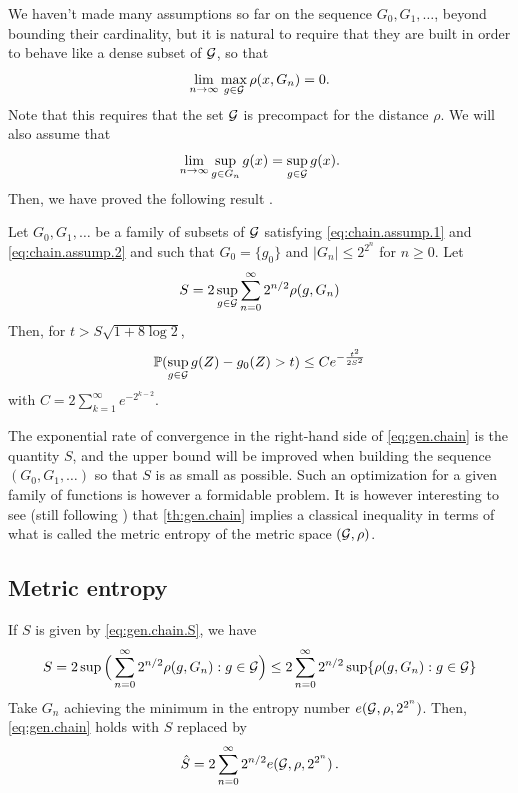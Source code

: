 We haven't made many assumptions so far on the sequence $G_0, G_1, \ldots$, beyond bounding their cardinality, but it is natural to require that they are built in order to behave like a dense subset of ${\mathcal G}$, so that 
\begin{equation}
\label{eq:chain.assump.1}
\lim_{n\to\infty} \max_{g\in {\mathcal G}} \rho(x, G_n) =0.
\end{equation}
Note that this requires that the set ${\mathcal G}$ is precompact for the distance $\rho$. We will also assume that 
\begin{equation}
\label{eq:chain.assump.2}
\lim_{n\to\infty} \sup_{g\in G_n} g(x) = \sup_{g\in {\mathcal G}} g(x).
\end{equation}
Then, we have proved the following result \citep{talagrand2006generic}.
\begin{theorem}
\label{th:gen.chain}
Let $G_0, G_1, \ldots$ be a family of subsets of ${\mathcal G}$ satisfying \cref{eq:chain.assump.1} and \cref{eq:chain.assump.2} and such that $G_0 = \{g_0\}$ and $|G_n| \leq 2^{2^n}$ for $n\geq 0$. Let 
\begin{equation}
\label{eq:gen.chain.S}
S = 2 \sup_{g\in {\mathcal G}} \sum_{n=0}^\infty 2^{n/2} \rho(g, G_n)
\end{equation}
Then, for $t>  S \sqrt{1 + 8\log 2}$, 
\begin{equation}
\label{eq:gen.chain}
\bm{\mathbb P}(\sup_{g\in {\mathcal G}} g(Z) - g_0(Z) > t) \leq C e^{-\frac{t^2}{2S^2}}
\end{equation}
with 
$C = 2 \sum_{k=1}^\infty e^{-2^{k-2}}$.
\end{theorem}

The exponential rate of convergence in the right-hand side of \cref{eq:gen.chain} is the quantity $S$, and the upper bound will be improved when building the sequence $(G_0, G_1, \ldots)$ so that $S$ is as small as possible. Such an optimization for a given family of functions is however a formidable problem. It is however interesting to see (still following \citep{talagrand2006generic}) that  \cref{th:gen.chain} implies a classical inequality in terms of what is called the metric entropy of the metric space $({\mathcal G}, \rho)$. 


\subsection{Metric entropy}

If $S$ is given by \cref{eq:gen.chain.S}, we have 
\[
S = 2 \sup\Big(\sum_{n=0}^\infty 2^{n/2} \rho(g, G_n): g\in{\mathcal G}\Big) \leq 2 \sum_{n=0}^\infty 2^{n/2} \sup\{ \rho(g, G_n) : g\in{\mathcal G}\}
\]
Take $G_n$ achieving the minimum in the entropy number $e({\mathcal G}, \rho, 2^{2^n})$. Then, \cref{eq:gen.chain} holds with $S$ replaced by
\[
\hat S = 2 \sum_{n=0}^\infty 2^{n/2} e({\mathcal G}, \rho, 2^{2^n})\,.
\]

